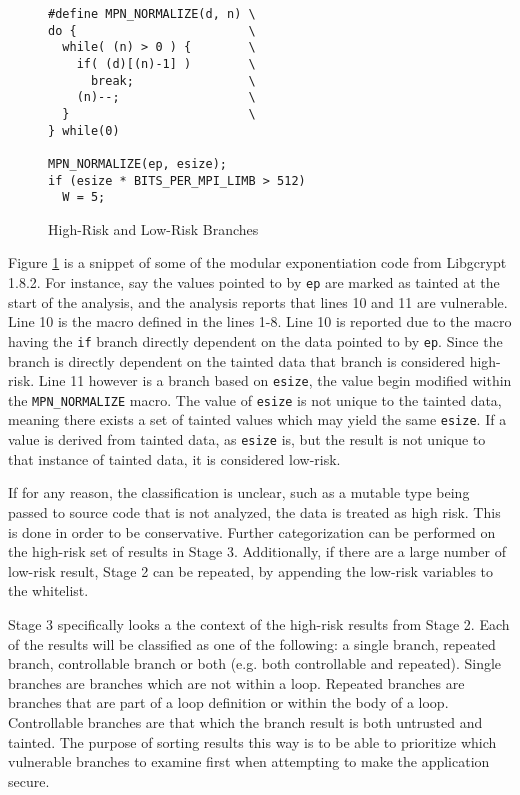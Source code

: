 \begin{figure}
\begin{lstlisting}
#define MPN_NORMALIZE(d, n) \
do {                        \
  while( (n) > 0 ) {        \
    if( (d)[(n)-1] )        \
      break;                \
    (n)--;                  \
  }                         \
} while(0)

MPN_NORMALIZE(ep, esize);
if (esize * BITS_PER_MPI_LIMB > 512)
  W = 5;
\end{lstlisting}
\caption{High-Risk and Low-Risk Branches}
\label{alg:branchriskexample}
\end{figure}


Figure \ref{alg:branchriskexample} is a snippet of some of the modular
exponentiation code from Libgcrypt 1.8.2. For instance, say the values pointed
to by \texttt{ep} are marked as tainted at the start of the analysis, and the
analysis reports that lines 10 and 11 are vulnerable. Line 10 is the macro
defined in the lines 1-8. Line 10 is reported due to the macro having the
\texttt{if} branch directly dependent on the data pointed to by \texttt{ep}.
Since the branch is directly dependent on the tainted data that branch is
considered high-risk. Line 11 however is a branch based on \texttt{esize}, the
value begin modified within the \texttt{MPN\_NORMALIZE} macro. The value of
\texttt{esize} is not unique to the tainted data, meaning there exists a set of
tainted values which may yield the same \texttt{esize}. If a value is derived
from tainted data, as \texttt{esize} is, but the result is not unique to that
instance of tainted data, it is considered low-risk.

If for any reason, the classification is unclear, such as a mutable type being
passed to source code that is not analyzed, the data is treated as high risk.
This is done in order to be conservative. Further categorization can be
performed on the high-risk set of results in Stage 3. Additionally, if there are
a large number of low-risk result, Stage 2 can be repeated, by appending the
low-risk variables to the whitelist.

Stage 3 specifically looks a the context of the high-risk results from Stage 2.
Each of the results will be classified as one of the following: a single branch, repeated
branch, controllable branch or both (e.g. both controllable and repeated).
Single branches are branches which are not within a loop. Repeated branches are
branches that are part of a loop definition or within the body of a loop.
Controllable branches are that which the branch result is both untrusted and
tainted. The purpose of sorting results this way is to be able to prioritize
which vulnerable branches to examine first when attempting to make the
application secure.